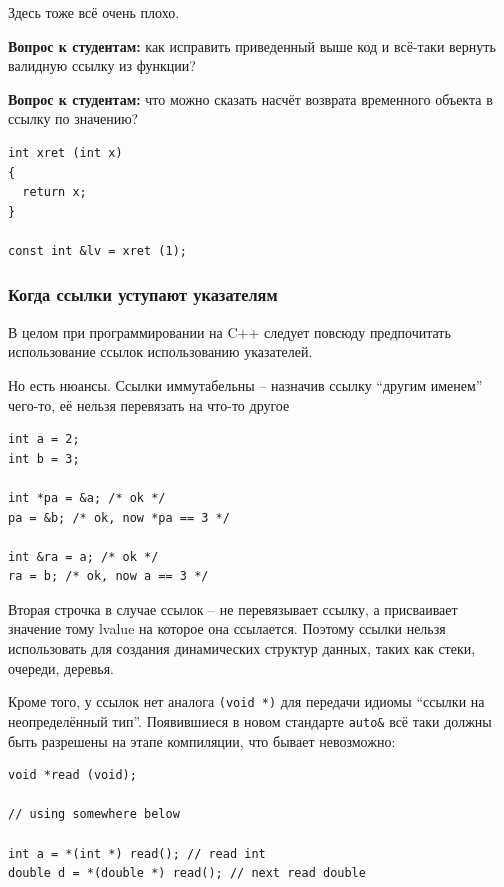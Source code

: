 \documentclass[a4paper,12pt,oneside]{article}
\newif\ifanswers
\begin{document}
Здесь тоже всё очень плохо.

\textbf{Вопрос к студентам:} как исправить приведенный выше код и всё-таки вернуть валидную ссылку из функции?

\ifanswers
Ответов может быть много: статические переменные, динамическая аллокация, глобалы, выберите ваш вариант
\fi

\textbf{Вопрос к студентам:} что можно сказать насчёт возврата временного объекта в ссылку по значению?

\begin{lstlisting}
int xret (int x)
{
  return x;
}

const int &lv = xret (1);
\end{lstlisting}

\ifanswers
Правильный ответ: тут всё нормально, работает обсуждавшееся выше расширение срока жизни.
\fi

\subsubsection{Когда ссылки уступают указателям}\label{PointersVsRefs}

В целом при программировании на C++ следует повсюду предпочитать использование ссылок использованию указателей.

Но есть нюансы. Ссылки иммутабельны -- назначив ссылку ``другим именем'' чего-то, её нельзя перевязать на что-то другое

\begin{lstlisting}
int a = 2;
int b = 3;

int *pa = &a; /* ok */
pa = &b; /* ok, now *pa == 3 */

int &ra = a; /* ok */
ra = b; /* ok, now a == 3 */
\end{lstlisting}

Вторая строчка в случае ссылок -- не перевязывает ссылку, а присваивает значение тому lvalue на которое она ссылается. Поэтому ссылки нельзя использовать для создания динамических структур данных, таких как стеки, очереди, деревья.

Кроме того, у ссылок нет аналога \lstinline!(void *)! для передачи идиомы ``ссылки на неопределённый тип''. Появившиеся в новом стандарте \lstinline!auto&! всё таки должны быть разрешены на этапе компиляции, что бывает невозможно:

\begin{lstlisting}
void *read (void);

// using somewhere below

int a = *(int *) read(); // read int
double d = *(double *) read(); // next read double
\end{lstlisting}
\end{document}
